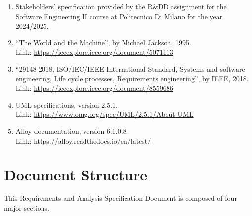 \begin{enumerate}
    \item Stakeholders’ specification provided by the R\&DD assignment for the Software Engineering II course at Politecnico Di Milano for the year 2024/2025.
    \item ``The World and the Machine'', by Michael Jackson, 1995. \\
    Link: \url{https://ieeexplore.ieee.org/document/5071113}
    \item ``29148-2018, ISO/IEC/IEEE International Standard, Systems and software engineering, Life cycle processes, Requirements engineering'', by IEEE, 2018. \\
    Link: \url{https://ieeexplore.ieee.org/document/8559686}
    \item UML specifications, version 2.5.1. \\
    Link: \url{https://www.omg.org/spec/UML/2.5.1/About-UML}
    \item Alloy documentation, version 6.1.0.8. \\
    Link: \url{https://alloy.readthedocs.io/en/latest/}
\end{enumerate}


\section{Document Structure}

This Requirements and Analysis Specification Document is composed of four major sections.

